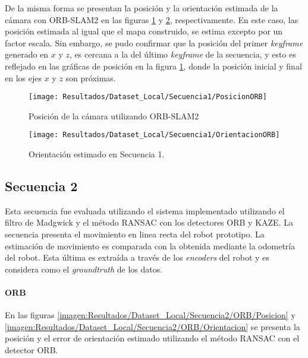 De la misma forma se presentan la posición y la orientación estimada de la cámara con ORB-SLAM2 en las figuras \ref{imagen:Resultados/Dataset_Local/Secuencia3/PosicionORB} y \ref{imagen:Resultados/Dataset_Local/Secuencia1/OrientacionORB}, respectivamente. En este caso, las posición estimada al igual que el mapa construido, se estima excepto por un factor escala. Sin embargo, se pudo confirmar que la posición del primer \textit{keyframe} generado en $x$ y $z$, es cercana a la del último \textit{keyframe} de la secuencia, y esto es reflejado en las gráficas de posición en la figura \ref{imagen:Resultados/Dataset_Local/Secuencia3/PosicionORB}, donde la posición inicial y final en los ejes $x$ y $z$ son próximas.


\begin{figure}[H]
	\centering
	\texttt{[image: Resultados/Dataset\_Local/Secuencia1/PosicionORB]}
	\caption{Posición de la cámara utilizando ORB-SLAM2}
	\label{imagen:Resultados/Dataset_Local/Secuencia3/PosicionORB}
\end{figure}


\begin{figure}[H]
	\centering
	\texttt{[image: Resultados/Dataset\_Local/Secuencia1/OrientacionORB]}
	\caption[Orientación estimada en Secuencia 1 utilizando ORB-SLAM2]{Orientación estimado en Secuencia 1.}
	\label{imagen:Resultados/Dataset_Local/Secuencia1/OrientacionORB}
\end{figure}

\subsection{Secuencia 2}

Esta secuencia fue evaluada utilizando el sistema implementado utilizando el filtro de Madgwick y el método RANSAC con los detectores ORB y KAZE. La secuencia presenta el movimiento en linea recta del robot prototipo. La estimación de movimiento es comparada con la obtenida mediante la odometría del robot. Esta última es extraída a través de los \textit{encoders} del robot y es considera como el \textit{groundtruth} de los datos.

\paragraph{ORB}
En las figuras \ref{imagen:Resultados/Dataset_Local/Secuencia2/ORB/Posicion} y \ref{imagen:Resultados/Dataset_Local/Secuencia2/ORB/Orientacion} se presenta la posición y el error de orientación estimado utilizando el método RANSAC con el detector ORB. 


